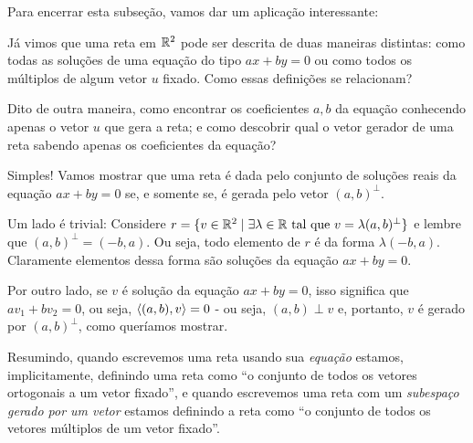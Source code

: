 Para encerrar esta subseção, vamos dar um aplicação interessante:
\begin{ex}
	Já vimos que uma reta em $\mathbb R^2$ pode ser descrita de duas maneiras distintas: como todas as soluções de uma equação do tipo $ax+by=0$ ou como todos os múltiplos de algum vetor $u$ fixado. Como essas definições se relacionam?
	
	Dito de outra maneira, como encontrar os coeficientes $a,b$ da equação conhecendo apenas o vetor $u$ que gera a reta; e como descobrir qual o vetor gerador de uma reta sabendo apenas os coeficientes da equação?
	
	Simples! Vamos mostrar que uma reta é dada pelo conjunto de soluções reais da equação $ax+by=0$ se, e somente se, é gerada pelo vetor $(a,b)^\perp$.
	
	Um lado é trivial: Considere $r=\{v\in\mathbb R^2\mid \exists\lambda\in \mathbb R\mbox{ tal que }v=\lambda(a,b)^\perp\}$ e lembre que $(a,b)^\perp=(-b,a)$. Ou seja, todo elemento de $r$ é da forma $\lambda(-b,a)$. Claramente elementos dessa forma são soluções da equação $ax+by=0$.
	
	Por outro lado, se $v$ é solução da equação $ax+by=0$, isso significa que $av_1+bv_2=0$, ou seja, $\langle (a,b),v\rangle=0$ - ou seja, $(a,b)\perp v$ e, portanto, $v$ é gerado por $(a,b)^\perp$, como queríamos mostrar.
	
	\tcblower
	Resumindo, quando escrevemos uma reta usando sua \textit{equação} estamos, implicitamente, definindo uma reta como ``o conjunto de todos os vetores ortogonais a um vetor fixado'', e quando escrevemos uma reta com um \textit{subespaço gerado por um vetor} estamos definindo a reta como ``o conjunto de todos os vetores múltiplos de um vetor fixado''.
\end{ex}